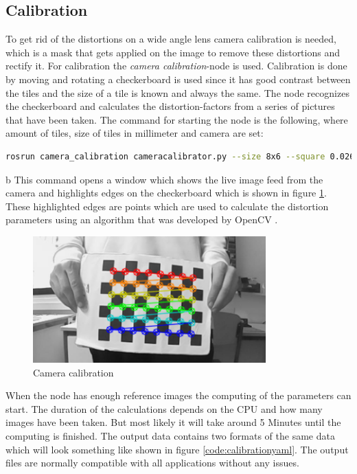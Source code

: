 \subsection{Calibration}
To get rid of the distortions on a wide angle lens camera calibration is needed, which is a mask that gets applied on the image to remove these distortions and rectify it.
For calibration the \textit{camera calibration}-node is used.  Calibration is done by moving and rotating a checkerboard is used since it has good contrast between the tiles and the size of a tile is known and always the same. The node recognizes the checkerboard and calculates the distortion-factors from a series of pictures that have been taken.\newline
The command for starting the node is the following, where amount of tiles, size of tiles in millimeter and camera are set:
\begin{lstlisting}[language=BASH,caption={Start Calibration Node}]
rosrun camera_calibration cameracalibrator.py --size 8x6 --square 0.026 --no-service-check image:=/camera/image_raw camera:=/camera
\end{lstlisting}
b
This command opens a window which shows the live image feed from the camera and highlights edges on the checkerboard which is shown in figure \ref{cameracalibration}. These highlighted edges are points which are used to calculate the distortion parameters using an algorithm that was developed by OpenCV \cite{cameracalibrationopencv}.
\begin{figure}[h]
	\centering
	\includegraphics[width=0.8\textwidth]{./media/images/CameraCalibration.png}
  	\caption{Camera calibration}
  	\label{cameracalibration}
\end{figure} \newline

When the node has enough reference images the computing of the parameters can start. The duration of the calculations depends on the CPU and how many images have been taken. But most likely it will take around 5 Minutes until the computing is finished. The output data contains two formats of the same data which will look something like shown in figure \ref{code:calibrationyaml}. The output files are normally compatible with all applications without any issues.



